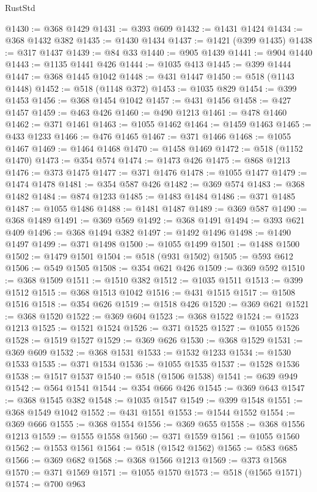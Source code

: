 \begin{lexlean}{RustStd}
\begin{coremodule}
@1430 := @368 @1429
@1431 := @393 @609
@1432 := @1431 @1424
@1434 := @368 @1432 @382
@1435 := @1430 @1434
@1437 := @1421 (@399 @1435)
@1438 := @317 @1437
@1439 := @84 @33
@1440 := @905 @1439
@1441 := @904 @1440
@1443 := @1135 @1441 @426
@1444 := @1035 @413
@1445 := @399 @1444
@1447 := @368 @1445 @1042
@1448 := @431 @1447
@1450 := @518 (@1143 @1448)
@1452 := @518 (@1148 @372)
@1453 := @1035 @829
@1454 := @399 @1453
@1456 := @368 @1454 @1042
@1457 := @431 @1456
@1458 := @427 @1457
@1459 := @463 @426
@1460 := @490 @1213
@1461 := @478 @1460
@1462 := @371 @1461
@1463 := @1055 @1462
@1464 := @1459 @1463
@1465 := @433 @1233
@1466 := @476 @1465
@1467 := @371 @1466
@1468 := @1055 @1467
@1469 := @1464 @1468
@1470 := @1458 @1469
@1472 := @518 (@1152 @1470)
@1473 := @354 @574
@1474 := @1473 @426
@1475 := @868 @1213
@1476 := @373 @1475
@1477 := @371 @1476
@1478 := @1055 @1477
@1479 := @1474 @1478
@1481 := @354 @587 @426
@1482 := @369 @574
@1483 := @368 @1482
@1484 := @874 @1233
@1485 := @1483 @1484
@1486 := @371 @1485
@1487 := @1055 @1486
@1488 := @1481 @1487
@1489 := @369 @587
@1490 := @368 @1489
@1491 := @369 @569
@1492 := @368 @1491
@1494 := @393 @621 @409
@1496 := @368 @1494 @382
@1497 := @1492 @1496
@1498 := @1490 @1497
@1499 := @371 @1498
@1500 := @1055 @1499
@1501 := @1488 @1500
@1502 := @1479 @1501
@1504 := @518 (@931 @1502)
@1505 := @593 @612
@1506 := @549 @1505
@1508 := @354 @621 @426
@1509 := @369 @592
@1510 := @368 @1509
@1511 := @1510 @382
@1512 := @1035 @1511
@1513 := @399 @1512
@1515 := @368 @1513 @1042
@1516 := @431 @1515
@1517 := @1508 @1516
@1518 := @354 @626
@1519 := @1518 @426
@1520 := @369 @621
@1521 := @368 @1520
@1522 := @369 @604
@1523 := @368 @1522
@1524 := @1523 @1213
@1525 := @1521 @1524
@1526 := @371 @1525
@1527 := @1055 @1526
@1528 := @1519 @1527
@1529 := @369 @626
@1530 := @368 @1529
@1531 := @369 @609
@1532 := @368 @1531
@1533 := @1532 @1233
@1534 := @1530 @1533
@1535 := @371 @1534
@1536 := @1055 @1535
@1537 := @1528 @1536
@1538 := @1517 @1537
@1540 := @518 (@1506 @1538)
@1541 := @639 @949
@1542 := @564 @1541
@1544 := @354 @666 @426
@1545 := @369 @643
@1547 := @368 @1545 @382
@1548 := @1035 @1547
@1549 := @399 @1548
@1551 := @368 @1549 @1042
@1552 := @431 @1551
@1553 := @1544 @1552
@1554 := @369 @666
@1555 := @368 @1554
@1556 := @369 @655
@1558 := @368 @1556 @1213
@1559 := @1555 @1558
@1560 := @371 @1559
@1561 := @1055 @1560
@1562 := @1553 @1561
@1564 := @518 (@1542 @1562)
@1565 := @583 @685
@1566 := @369 @682
@1568 := @368 @1566 @1213
@1569 := @373 @1568
@1570 := @371 @1569
@1571 := @1055 @1570
@1573 := @518 (@1565 @1571)
@1574 := @700 @963

\end{coremodule}
\end{lexlean}
